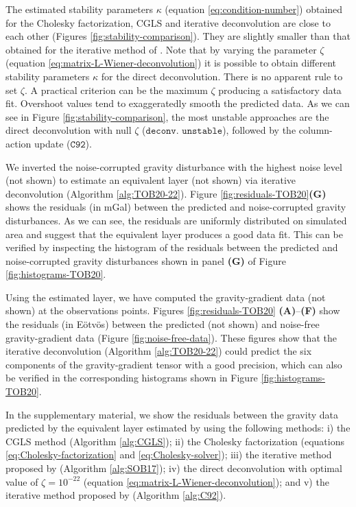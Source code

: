 The estimated stability parameters $\kappa$ (equation \ref{eq:condition-number}) obtained for the Cholesky factorization, CGLS and
iterative deconvolution are close to each other (Figures \ref{fig:stability-comparison}).
They are slightly smaller than that obtained for the iterative method of \citet{siqueira-etal2017}.
Note that by varying the parameter $\zeta$ (equation \ref{eq:matrix-L-Wiener-deconvolution}) it is possible to obtain different 
stability parameters $\kappa$ for the direct deconvolution. There is no apparent rule to set $\zeta$.
A practical criterion can be the maximum $\zeta$ producing a satisfactory data fit. Overshoot values tend to exaggeratedly smooth the 
predicted data.
As we can see in Figure \ref{fig:stability-comparison}, the most unstable approaches are the direct deconvolution with null $\zeta$
($\mathtt{deconv.}$ $\mathtt{unstable}$), followed by the column-action update ($\mathtt{C92}$).

We inverted the noise-corrupted gravity disturbance  with the highest noise level (not shown) 
to estimate an equivalent layer (not shown) via iterative deconvolution (Algorithm \ref{alg:TOB20-22}).
Figure \ref{fig:residuals-TOB20}\textbf{(G)} shows the residuals (in mGal) between the predicted and noise-corrupted 
gravity disturbances.
As we can see, the residuals are uniformly distributed on simulated area and suggest that the equivalent layer
produces a good data fit.
This can be verified by inspecting the histogram of the residuals between the predicted and noise-corrupted 
gravity disturbances shown in panel \textbf{(G)} of Figure \ref{fig:histograms-TOB20}.

Using the estimated layer, we have computed the gravity-gradient data (not shown) at the observations points.
Figures \ref{fig:residuals-TOB20} \textbf{(A)}--\textbf{(F)} show the residuals (in Eötvös)
between the predicted (not shown) and noise-free gravity-gradient data 
(Figure \ref{fig:noise-free-data}).
These figures show that the iterative deconvolution (Algorithm \ref{alg:TOB20-22}) could predict the six components of the
gravity-gradient tensor with a good precision, which can also be verified in the corresponding histograms shown in 
Figure \ref{fig:histograms-TOB20}.

In the supplementary material, we show the residuals between the gravity data predicted by the equivalent layer estimated by using the following methods:
i)  the CGLS method (Algorithm \ref{alg:CGLS});
ii) the  Cholesky factorization (equations \ref{eq:Cholesky-factorization} and \ref{eq:Cholesky-solver});
iii) the iterative method proposed by \citet{siqueira-etal2017} (Algorithm \ref{alg:SOB17});
iv) the direct deconvolution with  optimal value of $\zeta = 10^{-22}$ 
(equation \ref{eq:matrix-L-Wiener-deconvolution}); and
v) the iterative method  proposed by \cite{cordell1992} (Algorithm \ref{alg:C92}).



